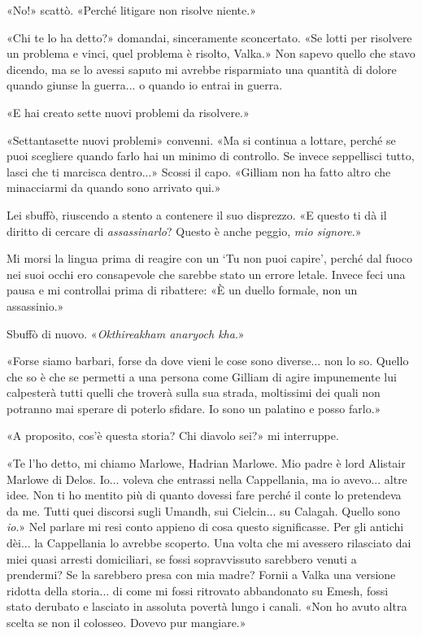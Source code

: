«No!» scattò. «Perché litigare non risolve niente.»

«Chi te lo ha detto?» domandai, sinceramente sconcertato. «Se lotti per
risolvere un problema e vinci, quel problema è risolto, Valka.» Non
sapevo quello che stavo dicendo, ma se lo avessi saputo mi avrebbe
risparmiato una quantità di dolore quando giunse la guerra... o quando
io entrai in guerra.

«E hai creato sette nuovi problemi da risolvere.»

«Settantasette nuovi problemi» convenni. «Ma si continua a lottare,
perché se puoi scegliere quando farlo hai un minimo di controllo. Se
invece seppellisci tutto, lasci che ti marcisca dentro...» Scossi il
capo. «Gilliam non ha fatto altro che minacciarmi da quando sono
arrivato qui.»

Lei sbuffò, riuscendo a stento a contenere il suo disprezzo. «E questo
ti dà il diritto di cercare di \emph{assassinarlo}? Questo è anche
peggio, \emph{mio signore}.»

Mi morsi la lingua prima di reagire con un `Tu non puoi capire', perché
dal fuoco nei suoi occhi ero consapevole che sarebbe stato un errore
letale. Invece feci una pausa e mi controllai prima di ribattere: «È un
duello formale, non un assassinio.»

Sbuffò di nuovo. «\emph{Okthireakham anaryoch kha}.»

«Forse siamo barbari, forse da dove vieni le cose sono diverse... non lo
so. Quello che so è che se permetti a una persona come Gilliam di agire
impunemente lui calpesterà tutti quelli che troverà sulla sua strada,
moltissimi dei quali non potranno mai sperare di poterlo sfidare. Io
sono un palatino e posso farlo.»

«A proposito, cos'è questa storia? Chi diavolo sei?» mi interruppe.

«Te l'ho detto, mi chiamo Marlowe, Hadrian Marlowe. Mio padre è lord
Alistair Marlowe di Delos. Io... voleva che entrassi nella Cappellania,
ma io avevo... altre idee. Non ti ho mentito più di quanto dovessi fare
perché il conte lo pretendeva da me. Tutti quei discorsi sugli Umandh,
sui Cielcin... su Calagah. Quello sono \emph{io}.» Nel parlare mi resi
conto appieno di cosa questo significasse. Per gli antichi dèi... la
Cappellania lo avrebbe scoperto. Una volta che mi avessero rilasciato
dai miei quasi arresti domiciliari, se fossi sopravvissuto sarebbero
venuti a prendermi? Se la sarebbero presa con mia madre? Fornii a Valka
una versione ridotta della storia... di come mi fossi ritrovato
abbandonato su Emesh, fossi stato derubato e lasciato in assoluta
povertà lungo i canali. «Non ho avuto altra scelta se non il colosseo.
Dovevo pur mangiare.»

